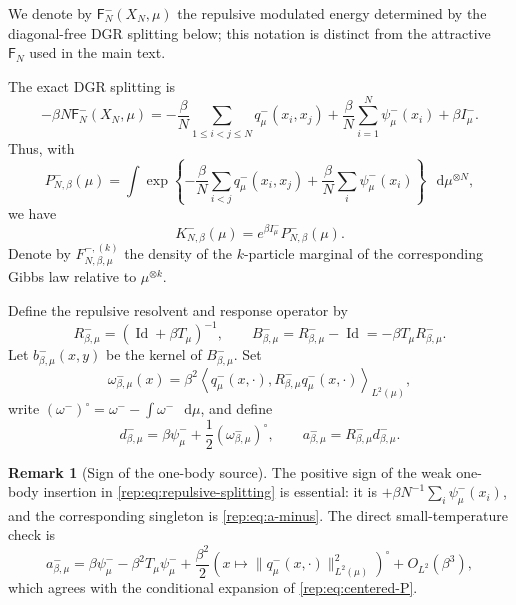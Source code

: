 \documentclass[11pt,reqno]{amsart}
\numberwithin{equation}{section}
\theoremstyle{plain}
\theoremstyle{definition}
\newtheorem{remark}[remark]{Remark}
\newcommand{\dd}{\mathop{}\!\mathrm d}
\newcommand{\Id}{\operatorname{Id}}
\newcommand{\be}{\beta}
\newcommand{\Fr}{\mathsf F}
\begin{document}
We denote by \(\Fr_N^-(X_N,\mu)\) the repulsive modulated energy determined by the diagonal-free DGR splitting below; this notation is distinct from the attractive \(\Fr_N\) used in the main text.

The exact DGR splitting is
\begin{equation}\label{rep:eq:repulsive-splitting}
 -\be N\Fr_N^-(X_N,\mu)
 =-\frac\be N\sum_{1\le i<j\le N}q^-_\mu(x_i,x_j)
  +\frac\be N\sum_{i=1}^N\psi^-_\mu(x_i)+\be I^-_\mu.
\end{equation}
Thus, with
\begin{equation}\label{rep:eq:centered-P}
 P^-_{N,\be}(\mu)=\int\exp\left\{
 -\frac\be N\sum_{i<j}q^-_\mu(x_i,x_j)
 +\frac\be N\sum_i\psi^-_\mu(x_i)
 \right\}\,\dd\mu^{\otimes N},
\end{equation}
we have
\begin{equation}\label{rep:eq:K-P}
 K^-_{N,\be}(\mu)=e^{\be I^-_\mu}P^-_{N,\be}(\mu).
\end{equation}
Denote by $F_{N,\be,\mu}^{-,(k)}$ the density of the $k$-particle marginal of the corresponding Gibbs law relative to $\mu^{\otimes k}$.

Define the repulsive resolvent and response operator by
\begin{equation}\label{rep:eq:Rminus-Bminus}
 R^-_{\be,\mu}=(\Id+\be T_\mu)^{-1},\qquad
 B^-_{\be,\mu}=R^-_{\be,\mu}-\Id
 =-\be T_\mu R^-_{\be,\mu}.
\end{equation}
Let $b^-_{\be,\mu}(x,y)$ be the kernel of $B^-_{\be,\mu}$. Set
\begin{equation}\label{rep:eq:omega-minus}
 \omega^-_{\be,\mu}(x)
 =\be^2\left\langle q^-_\mu(x,\cdot),
 R^-_{\be,\mu}q^-_\mu(x,\cdot)\right\rangle_{L^2(\mu)},
\end{equation}
write $(\omega^-)^\circ=\omega^- -\int\omega^-\,\dd\mu$, and define
\begin{equation}\label{rep:eq:a-minus}
 d^-_{\be,\mu}=\be\psi^-_\mu+\frac12(\omega^-_{\be,\mu})^\circ,
 \qquad
 a^-_{\be,\mu}=R^-_{\be,\mu}d^-_{\be,\mu}.
\end{equation}

\begin{remark}[Sign of the one-body source]\label{rep:rem:sign-correction}
The positive sign of the weak one-body insertion in \eqref{rep:eq:repulsive-splitting} is essential: it is $+\be N^{-1}\sum_i\psi^-_\mu(x_i)$, and the corresponding singleton is \eqref{rep:eq:a-minus}. The direct small-temperature check is
\begin{equation}\label{rep:eq:small-beta-a}
 a^-_{\be,\mu}
 =\be\psi^-_\mu-\be^2T_\mu\psi^-_\mu
 +\frac{\be^2}{2}\left(
 x\mapsto\|q^-_\mu(x,\cdot)\|_{L^2(\mu)}^2
 \right)^\circ+O_{L^2}(\be^3),
\end{equation}
which agrees with the conditional expansion of \eqref{rep:eq:centered-P}.
\end{remark}
\end{document}
